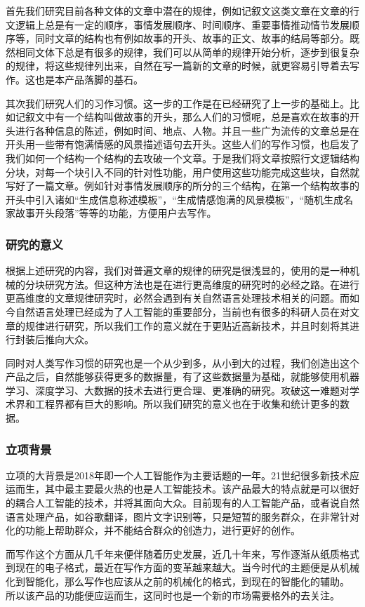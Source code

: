 \documentclass[10pt,letterpaper]{article}
\begin{document}
首先我们研究目前各种文体的文章中潜在的规律，例如记叙文这类文章在文章的行文逻辑上总是有一定的顺序，事情发展顺序、时间顺序、重要事情推动情节发展顺序等，同时文章的结构也有例如故事的开头、故事的正文、故事的结局等部分。既然相同文体下总是有很多的规律，我们可以从简单的规律开始分析，逐步到很复杂的规律，将这些规律列出来，自然在写一篇新的文章的时候，就更容易引导着去写作。这也是本产品落脚的基石。

其次我们研究人们的习作习惯。这一步的工作是在已经研究了上一步的基础上。比如记叙文中有一个结构叫做故事的开头，那么人们的习惯呢，总是喜欢在故事的开头进行各种信息的陈述，例如时间、地点、人物。并且一些广为流传的文章总是在开头用一些带有饱满情感的风景描述语句去开头。这些人们的写作习惯，也启发了我们如何一个结构一个结构的去攻破一个文章。于是我们将文章按照行文逻辑结构分块，对每一个块引入不同的针对性功能，用户使用这些功能完成这些块，自然就写好了一篇文章。例如针对事情发展顺序的所分的三个结构，在第一个结构故事的开头中引入诸如“生成信息称述模板”，“生成情感饱满的风景模板”，“随机生成名家故事开头段落”等等的功能，方便用户去写作。
\subsubsection{研究的意义}
根据上述研究的内容，我们对普遍文章的规律的研究是很浅显的，使用的是一种机械的分块研究方法。但这种方法也是在进行更高维度的研究时的必经之路。在进行更高维度的文章规律研究时，必然会遇到有关自然语言处理技术相关的问题。而如今自然语言处理已经成为了人工智能的重要部分，当前也有很多的科研人员在对文章的规律进行研究，所以我们工作的意义就在于更贴近高新技术，并且时刻将其进行封装后推向大众。

同时对人类写作习惯的研究也是一个从少到多，从小到大的过程，我们创造出这个产品之后，自然能够获得更多的数据量，有了这些数据量为基础，就能够使用机器学习、深度学习、大数据的技术去进行更合理、更准确的研究。攻破这一难题对学术界和工程界都有巨大的影响。所以我们研究的意义也在于收集和统计更多的数据。

\subsubsection{立项背景}
立项的大背景是2018年即一个人工智能作为主要话题的一年。21世纪很多新技术应运而生，其中最主要最火热的也是人工智能技术。该产品最大的特点就是可以很好的耦合人工智能的技术，并将其面向大众。目前现有的人工智能产品，或者说自然语言处理产品，如谷歌翻译，图片文字识别等，只是短暂的服务群众，在非常针对化的功能上帮助群众，并不能结合群众的创造力，进行更好的创作。

而写作这个方面从几千年来便伴随着历史发展，近几十年来，写作逐渐从纸质格式到现在的电子格式，最近在写作方面的变革越来越大。当今时代的主题便是从机械化到智能化，那么写作也应该从之前的机械化的格式，到现在的智能化的辅助。
所以该产品的功能便应运而生，这同时也是一个新的市场需要格外的去关注。
\end{document}
